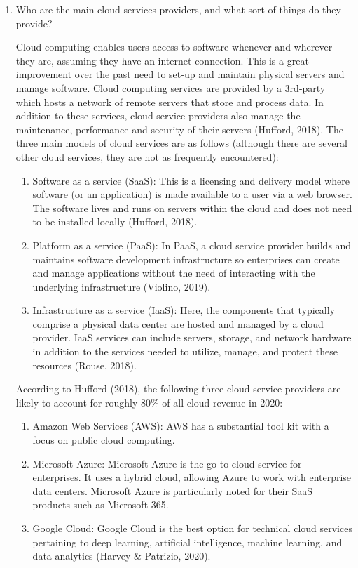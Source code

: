 \documentclass[]{article}
\begin{document}
\begin{enumerate}
\item Who are the main cloud services providers, and what sort of things do they provide?

Cloud computing enables users access to software whenever and wherever they are, assuming they have an internet connection.  This is a great improvement over the past need to set-up and maintain physical servers and manage software.  Cloud computing services are provided by a 3rd-party which hosts a network of remote servers that store and process data.  In addition to these services, cloud service providers also manage the maintenance, performance and security of their servers (Hufford, 2018).  The three main models of cloud services are as follows (although there are several other cloud services, they are not as frequently encountered):
\begin{enumerate}
	\item Software as a service (SaaS): This is a licensing and delivery model where software (or an application) is made available to a user via a web browser.  The software lives and runs on servers within the cloud and does not need to be installed locally (Hufford, 2018).
	\item Platform as a service (PaaS): In PaaS, a cloud service provider builds and maintains software development infrastructure so enterprises can create and manage applications without the need of interacting with the underlying infrastructure (Violino, 2019).
	\item Infrastructure as a service (IaaS): Here, the components that typically comprise a physical data center are hosted and managed by a cloud provider.  IaaS services can include servers, storage, and network hardware in addition to the services needed to utilize, manage, and protect these resources (Rouse, 2018).
\end{enumerate}
According to Hufford (2018), the following three cloud service providers are likely to account for roughly 80\% of all cloud revenue in 2020:
\begin{enumerate}
	\item Amazon Web Services (AWS):  AWS has a substantial tool kit with a focus on public cloud computing.
	\item Microsoft Azure: Microsoft Azure is the go-to cloud service for enterprises.  It uses a hybrid cloud, allowing Azure to work with enterprise data centers.  Microsoft Azure is particularly noted for their SaaS products such as Microsoft 365.
	\item Google Cloud:  Google Cloud is the best option for technical cloud services pertaining to deep learning, artificial intelligence, machine learning, and data analytics (Harvey \& Patrizio, 2020).
\end{enumerate}



\end{enumerate}
\end{document}
